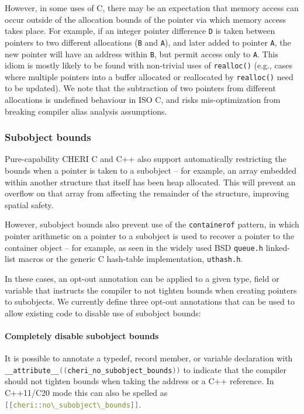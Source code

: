 \documentclass[11pt]{article}
\newcommand{\ccode}[1]{\lstinline[language={C},basicstyle=\small\ttfamily]{#1}}
\newcommand{\cxxcode}[1]{\lstinline[language={C++}]{#1}}
\newcommand{\note}[2]{{\color{blue}[ Note: #1 - #2]}}
\renewcommand{\note}[2]{}
\newcommand{\bdnote}[1]{\note{#1}{Brooks D.}}
\begin{document}
However, in some uses of C, there may be an expectation that memory access can
occur outside of the allocation bounds of the pointer via which memory access
takes place.
For example, if an integer pointer difference \texttt{D} is taken between
pointers to two different allocations (\texttt{B} and \texttt{A}), and later
added to pointer \texttt{A}, the new pointer will have an address
within \texttt{B}, but permit access only to \texttt{A}.
This idiom is mostly likely to be found with non-trivial uses of \texttt{realloc()} (e.g., cases where multiple pointers into a buffer allocated or reallocated by \texttt{realloc()} need to be updated).
We note that the subtraction of two pointers from different
allocations is undefined behaviour in ISO C, and risks mis-optimization from
breaking compiler alias analysis assumptions.

\subsubsection{Subobject bounds}

Pure-capability CHERI C and C++ also support automatically restricting the
bounds when a pointer is taken to a subobject -- for example, an array
embedded within another structure that itself has been heap allocated.
This will prevent an overflow on that array from affecting the remainder of
the structure, improving spatial safety.

However, subobject bounds also prevent use of the \texttt{containerof}
pattern, in which pointer arithmetic on a pointer to a subobject is used to
recover a pointer to the container object -- for example, as seen in the
widely used BSD \texttt{queue.h} linked-list macros or the generic C
hash-table implementation, \texttt{uthash.h}.

In these cases, an opt-out annotation can be applied to a given type, field or variable
that instructs the compiler to not tighten bounds when creating pointers to subobjects.
We currently define three opt-out annotations that can be used to allow
existing code to disable use of subobject bounds:

\paragraph{Completely disable subobject bounds} It is possible to annotate a typedef, record member,
or variable declaration with \ccode{__attribute__((cheri_no_subobject_bounds))} to indicate that the compiler should not tighten bounds when taking the address or a C++ reference. In C++11/C20 mode this can also be spelled as \cxxcode{[[cheri::no\_subobject\_bounds]]}.
\end{document}
